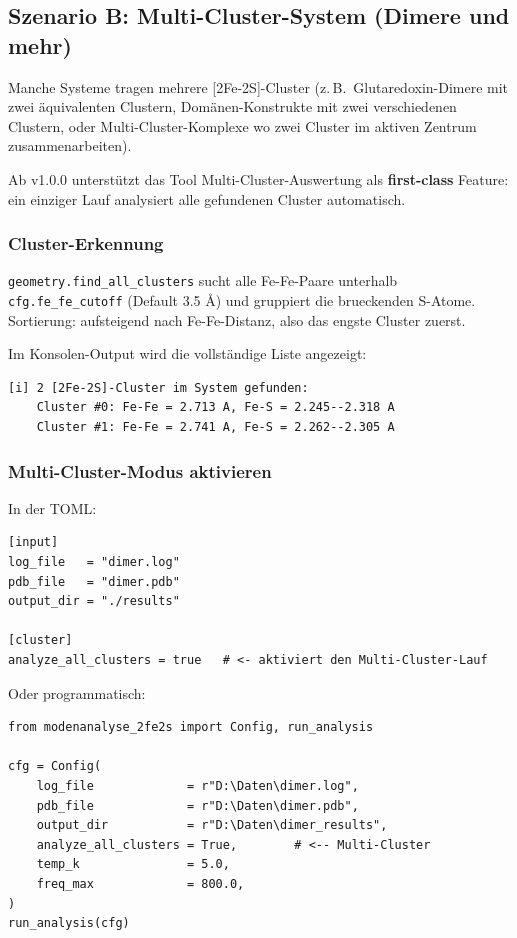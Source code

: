 \documentclass[11pt,a4paper,twoside]{article}
\theoremstyle{remark}
\begin{document}
\subsection{Szenario B: Multi-Cluster-System (Dimere und mehr)}
\label{sec:workflow-multi}

Manche Systeme tragen mehrere {[}2Fe-2S{]}-Cluster (z.\,B.\
Glutaredoxin-Dimere mit zwei \"aquivalenten Clustern, Dom\"anen-Konstrukte
mit zwei verschiedenen Clustern, oder Multi-Cluster-Komplexe wo zwei
Cluster im aktiven Zentrum zusammenarbeiten).

Ab v1.0.0 unterst\"utzt das Tool Multi-Cluster-Auswertung als
\textbf{first-class} Feature: ein einziger Lauf analysiert alle gefundenen
Cluster automatisch.

\subsubsection*{Cluster-Erkennung}

\texttt{geometry.find\_all\_clusters} sucht alle Fe-Fe-Paare unterhalb
\texttt{cfg.fe\_fe\_cutoff} (Default 3.5 \AA{}) und gruppiert die
brueckenden S-Atome. Sortierung: aufsteigend nach Fe-Fe-Distanz, also
das engste Cluster zuerst.

Im Konsolen-Output wird die vollst\"andige Liste angezeigt:

\begin{lstlisting}[style=bash]
[i] 2 [2Fe-2S]-Cluster im System gefunden:
    Cluster #0: Fe-Fe = 2.713 A, Fe-S = 2.245--2.318 A
    Cluster #1: Fe-Fe = 2.741 A, Fe-S = 2.262--2.305 A
\end{lstlisting}

\subsubsection*{Multi-Cluster-Modus aktivieren}

In der TOML:

\begin{lstlisting}[style=python]
[input]
log_file   = "dimer.log"
pdb_file   = "dimer.pdb"
output_dir = "./results"

[cluster]
analyze_all_clusters = true   # <- aktiviert den Multi-Cluster-Lauf
\end{lstlisting}

Oder programmatisch:

\begin{lstlisting}[style=python]
from modenanalyse_2fe2s import Config, run_analysis

cfg = Config(
    log_file             = r"D:\Daten\dimer.log",
    pdb_file             = r"D:\Daten\dimer.pdb",
    output_dir           = r"D:\Daten\dimer_results",
    analyze_all_clusters = True,        # <-- Multi-Cluster
    temp_k               = 5.0,
    freq_max             = 800.0,
)
run_analysis(cfg)
\end{lstlisting}
\end{document}
